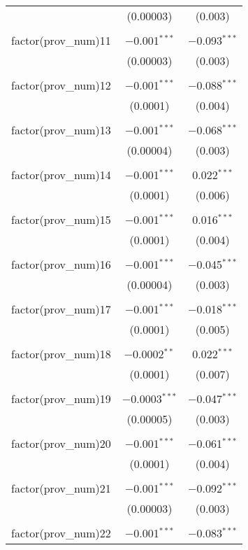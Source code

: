 \begin{table}[!htbp]
\begin{tabular}{@{\extracolsep{5pt}}lcc}
  & (0.00003) & (0.003) \\ 
  & & \\ 
 factor(prov\_num)11 & $-$0.001$^{***}$ & $-$0.093$^{***}$ \\ 
  & (0.00003) & (0.003) \\ 
  & & \\ 
 factor(prov\_num)12 & $-$0.001$^{***}$ & $-$0.088$^{***}$ \\ 
  & (0.0001) & (0.004) \\ 
  & & \\ 
 factor(prov\_num)13 & $-$0.001$^{***}$ & $-$0.068$^{***}$ \\ 
  & (0.00004) & (0.003) \\ 
  & & \\ 
 factor(prov\_num)14 & $-$0.001$^{***}$ & 0.022$^{***}$ \\ 
  & (0.0001) & (0.006) \\ 
  & & \\ 
 factor(prov\_num)15 & $-$0.001$^{***}$ & 0.016$^{***}$ \\ 
  & (0.0001) & (0.004) \\ 
  & & \\ 
 factor(prov\_num)16 & $-$0.001$^{***}$ & $-$0.045$^{***}$ \\ 
  & (0.00004) & (0.003) \\ 
  & & \\ 
 factor(prov\_num)17 & $-$0.001$^{***}$ & $-$0.018$^{***}$ \\ 
  & (0.0001) & (0.005) \\ 
  & & \\ 
 factor(prov\_num)18 & $-$0.0002$^{**}$ & 0.022$^{***}$ \\ 
  & (0.0001) & (0.007) \\ 
  & & \\ 
 factor(prov\_num)19 & $-$0.0003$^{***}$ & $-$0.047$^{***}$ \\ 
  & (0.00005) & (0.003) \\ 
  & & \\ 
 factor(prov\_num)20 & $-$0.001$^{***}$ & $-$0.061$^{***}$ \\ 
  & (0.0001) & (0.004) \\ 
  & & \\ 
 factor(prov\_num)21 & $-$0.001$^{***}$ & $-$0.092$^{***}$ \\ 
  & (0.00003) & (0.003) \\ 
  & & \\ 
 factor(prov\_num)22 & $-$0.001$^{***}$ & $-$0.083$^{***}$ \\ 

\end{tabular}
\end{table}
